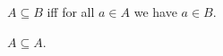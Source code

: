 \begin{definition}\label{subseteq}
    $A\subseteq B$ iff
    for all $a\in A$ we have $a\in B$.
\end{definition}

\begin{proposition}\label{subseteq_refl}
    $A\subseteq A$.
\end{proposition}
